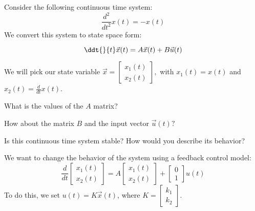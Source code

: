 



Consider the following continuous time system:
$$
\frac{d^2}{dt^2} x(t) = -x(t)
$$
We convert this system to state space form:

\begin{equation}
  \ddt{}{t} \vec{x}(t) = A \vec{x}(t) + B \vec{u}(t)
\end{equation}

We will pick our state variable $\vec{x} = \begin{bmatrix} x_1(t) \\ x_2(t) \end{bmatrix},$
with $x_1(t) = x(t)$ and $x_2(t) = \frac{d}{dt} x(t)$. 

\begin{enumerate}

\qitem What is the values of the $A$ matrix?


\qitem How about the matrix $B$ and the input vector $\vec{u}(t)?$ 


\qitem Is this continuous time system stable? How would you describe its behavior?

\end{enumerate}

We want to change the behavior of the system using a feedback control model:
$$
\frac{d}{dt}
\begin{bmatrix}
x_1(t) \\
x_2(t)
\end{bmatrix}
=
A
\begin{bmatrix}
x_1(t) \\
x_2(t)
\end{bmatrix}
+ 
\begin{bmatrix}
0 \\
1
\end{bmatrix}
u(t)
$$
To do this, we set $u(t) = K\vec{x}(t)$, where $K = \begin{bmatrix} k_1 \\ k_2 \end{bmatrix}$. 


